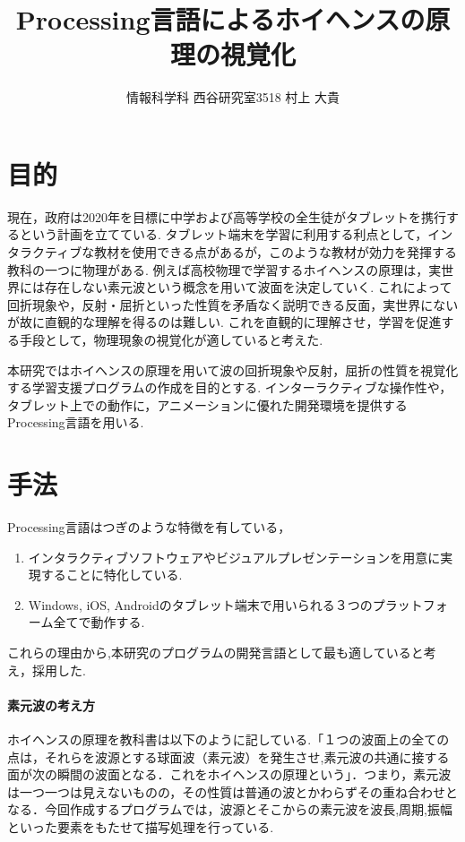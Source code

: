 \documentclass[a4j,twocolumn,uplatex]{jarticle}
\begin{document}
\title{Processing言語によるホイヘンスの原理の視覚化}
\author{情報科学科 西谷研究室3518 村上 大貴}
\date{}
\maketitle
\section{目的}
\vspace{-0.5em}
現在，政府は2020年を目標に中学および高等学校の全生徒がタブレットを携行するという計画を立てている\cite{tablet}.
タブレット端末を学習に利用する利点として，インタラクティブな教材を使用できる点があるが，このような教材が効力を発揮する教科の一つに物理がある.
例えば高校物理で学習するホイヘンスの原理は，実世界には存在しない素元波という概念を用いて波面を決定していく. これによって回折現象や，反射・屈折といった性質を矛盾なく説明できる反面，実世界にないが故に直観的な理解を得るのは難しい.
これを直観的に理解させ，学習を促進する手段として，物理現象の視覚化が適していると考えた.

本研究ではホイヘンスの原理を用いて波の回折現象や反射，屈折の性質を視覚化する学習支援プログラムの作成を目的とする.
インターラクティブな操作性や，タブレット上での動作に，アニメーションに優れた開発環境を提供するProcessing言語を用いる. 

\vspace{-2em}
\section{手法}
\vspace{-0.5em}
Processing言語はつぎのような特徴を有している\cite{ishikawa}，
\begin{enumerate}
\item インタラクティブソフトウェアやビジュアルプレゼンテーションを用意に実現することに特化している.
\item Windows, iOS, Androidのタブレット端末で用いられる３つのプラットフォーム全てで動作する. 
\end{enumerate}
これらの理由から,本研究のプログラムの開発言語として最も適していると考え，採用した.

\vspace{-1em}
\paragraph{素元波の考え方}
ホイヘンスの原理を教科書は以下のように記している.「１つの波面上の全ての点は，それらを波源とする球面波（素元波）を発生させ,素元波の共通に接する面が次の瞬間の波面となる．これをホイヘンスの原理という」\cite[p.195]{kyoukasyo}．つまり，素元波は一つ一つは見えないものの，その性質は普通の波とかわらずその重ね合わせとなる．今回作成するプログラムでは，波源とそこからの素元波を波長,周期,振幅といった要素をもたせて描写処理を行っている.
\end{document}
